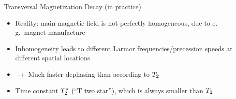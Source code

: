 \begin{frame}{Transversal Magnetization Decay (in practice)}

    \begin{itemize}
        \item Reality: main magnetic field  is not perfectly homogeneous, due to e.\,g.~magnet manufacture
        \item Inhomogeneity leads to different Larmor frequencies/precession speeds at different spatial locations
        \item $\rightarrow$ Much faster dephasing than according to $T_2{}$
        \item Time constant $T_2^*{}$ (``T two star''), which is always smaller than $T_2{}$
    \end{itemize}
\end{frame}

